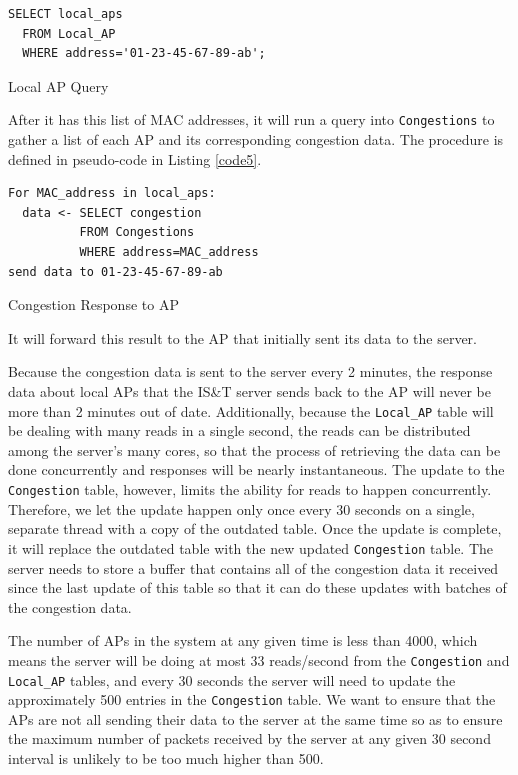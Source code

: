 \documentclass[journal]{IEEEtran}
\begin{document}
\begin{listing}[H]
\begin{verbatim}
SELECT local_aps
  FROM Local_AP
  WHERE address='01-23-45-67-89-ab';
\end{verbatim}
\caption{Local AP Query}
\label{code4}
\end{listing}
 
After it has this list of MAC addresses, it will run a query into \verb|Congestions| to gather a list of each AP and its corresponding congestion data. The procedure is defined in pseudo-code in Listing \ref{code5}.
 
\begin{listing}[H]
\begin{verbatim}
For MAC_address in local_aps:
  data <- SELECT congestion
          FROM Congestions
          WHERE address=MAC_address
send data to 01-23-45-67-89-ab
\end{verbatim}
\caption{Congestion Response to AP}
\label{code5}
\end{listing}
 
It will forward this result to the AP that initially sent its data to the server.
 
Because the congestion data is sent to the server every 2 minutes, the response data about local APs that the IS\&T server sends back to the AP will never be more than 2 minutes out of date. Additionally, because the \verb|Local_AP| table will be dealing with many reads in a single second, the reads can be distributed among the server's many cores, so that the process of retrieving the data can be done concurrently and responses will be nearly instantaneous. The update to the \verb|Congestion| table, however, limits the ability for reads to happen concurrently. Therefore, we let the update happen only once every 30 seconds on a single, separate thread with a copy of the outdated table. Once the update is complete, it will replace the outdated table with the new updated \verb|Congestion| table. The server needs to store a buffer that contains all of the congestion data it received since the last update of this table so that it can do these updates with batches of the congestion data.
 
The number of APs in the system at any given time is less than 4000, which means the server will be doing at most 33 reads/second from the \verb|Congestion| and \verb|Local_AP| tables, and every 30 seconds the server will need to update the approximately 500 entries in the \verb|Congestion| table. We want to ensure that the APs are not all sending their data to the server at the same time so as to ensure the maximum number of packets received by the server at any given 30 second interval is unlikely to be too much higher than 500.
\end{document}
